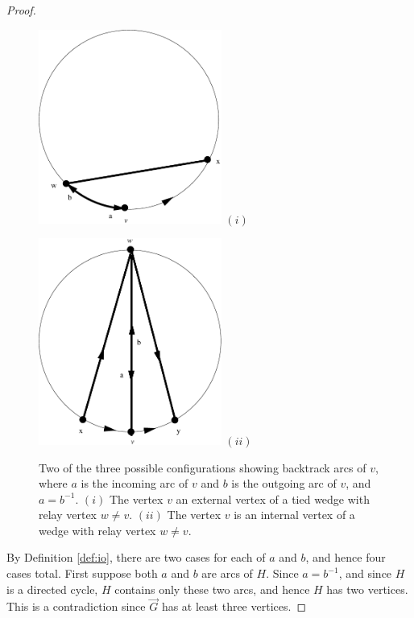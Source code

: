 \documentclass[12pt,letterpaper,oneside]{book}
\begin{document}
\begin{proof}
\begin{figure}[htp] 
\begin{minipage}[b]{0.5\linewidth}
\centering 
{\includegraphics[width=6cm]{wedgebka.pdf}} 
\newline
$(i)$
\end{minipage}
\hspace{0.5cm}
\begin{minipage}[b]{0.5\linewidth}
\centering
{\includegraphics[width=6cm]{wedgebkb.pdf}} 
\newline
$(ii)$
\end{minipage}
\caption[Examples of a backtrack arc of a vertex]{Two of the three possible configurations showing backtrack arcs of $v$, 
where $a$ is the incoming arc of 
$v$ and $b$ is the outgoing arc of $v$, and $a=b^{-1}$.  \newline  
$(i)$  The vertex $v$ an external vertex of a tied wedge with relay vertex $w\ne v$.  \newline  
$(ii)$ The vertex $v$ is an internal vertex of a wedge with relay vertex $w\ne v$.  \label{fig:wedgebkt}} 
\end{figure} 


By Definition \ref{def:io}, there are two cases for each of $a$ and $b$, and hence four cases total.  First suppose both $a$ and $b$ are 
arcs of $H$.  Since $a=b^{-1}$, and since $H$ is a directed cycle, $H$ contains only these two arcs, and hence $H$ has two vertices.  
This is a contradiction since $\vec{G}$ has at least three vertices.  



\end{proof}
\end{document}
